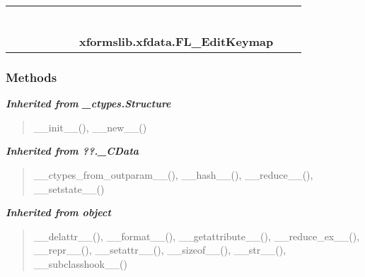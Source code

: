     \label{xformslib:xfdata:FL_EditKeymap}
\begin{tabular}{cccccccccc}
\multicolumn{2}{r}{\settowidth{\BCL}{object}\multirow{2}{\BCL}{object}}
&&
&&
&&
  \\\cline{3-3}
  &&\multicolumn{1}{c|}{}
&&
&&
&&
  \\
\multicolumn{4}{r}{\settowidth{\BCL}{??.\_CData}\multirow{2}{\BCL}{??.\_CData}}
&&
&&
  \\\cline{5-5}
  &&&&\multicolumn{1}{c|}{}
&&
&&
  \\
\multicolumn{6}{r}{\settowidth{\BCL}{\_ctypes.Structure}\multirow{2}{\BCL}{\_ctypes.Structure}}
&&
  \\\cline{7-7}
  &&&&&&\multicolumn{1}{c|}{}
&&
  \\
&&&&&&\multicolumn{2}{l}{\textbf{xformslib.xfdata.FL\_EditKeymap}}
\end{tabular}



  \subsubsection{Methods}


\large{\textbf{\textit{Inherited from \_ctypes.Structure}}}

\begin{quote}
\_\_init\_\_(), \_\_new\_\_()
\end{quote}

\large{\textbf{\textit{Inherited from ??.\_CData}}}

\begin{quote}
\_\_ctypes\_from\_outparam\_\_(), \_\_hash\_\_(), \_\_reduce\_\_(), \_\_setstate\_\_()
\end{quote}

\large{\textbf{\textit{Inherited from object}}}

\begin{quote}
\_\_delattr\_\_(), \_\_format\_\_(), \_\_getattribute\_\_(), \_\_reduce\_ex\_\_(), \_\_repr\_\_(), \_\_setattr\_\_(), \_\_sizeof\_\_(), \_\_str\_\_(), \_\_subclasshook\_\_()
\end{quote}

